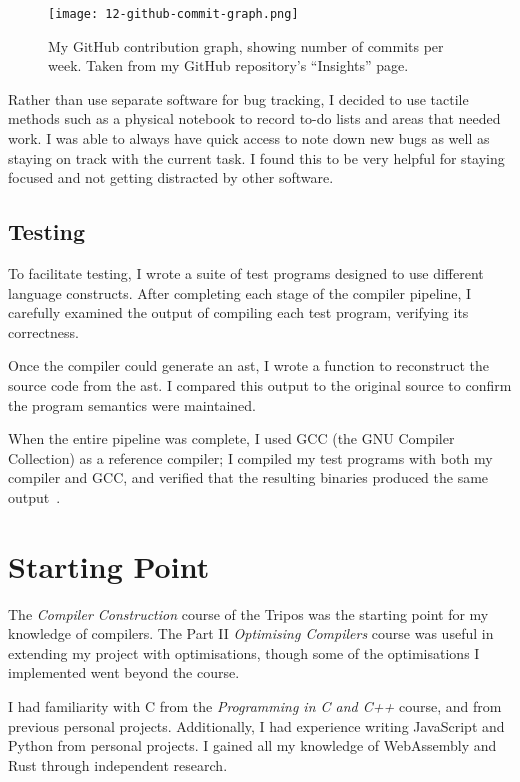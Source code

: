 \documentclass[00-main.tex]{subfiles}
\begin{document}
\begin{figure}[t]
  \centering
  \texttt{[image: 12-github-commit-graph.png]}
  \caption{My GitHub contribution graph, showing number of commits per week. Taken from my GitHub repository's ``Insights'' page.}%
  \label{fig:github contribution graph}
\end{figure}

Rather than use separate software for bug tracking, I decided to use tactile methods such as a physical notebook to record to-do lists and areas that needed work.
I was able to always have quick access to note down new bugs as well as staying on track with the current task.
I found this to be very helpful for staying focused and not getting distracted by other software.

\subsection{Testing}

To facilitate testing, I wrote a suite of test programs designed to use different language constructs.
After completing each stage of the compiler pipeline, I carefully examined the output of compiling each test program, verifying its correctness.

Once the compiler could generate an \gls{ast}, I wrote a function to reconstruct the source code from the \gls{ast}.
I compared this output to the original source to confirm the program semantics were maintained.

When the entire pipeline was complete, I used GCC (the GNU Compiler Collection) as a reference compiler; I compiled my test programs with both my compiler and GCC, and verified that the resulting binaries produced the same output~.

\section{Starting Point}

The \emph{Compiler Construction} course of the Tripos was the starting point for my knowledge of compilers.
The Part II \emph{Optimising Compilers} course was useful in extending my project with optimisations, though some of the optimisations I implemented went beyond the course.

I had familiarity with C from the \emph{Programming in C and C++} course, and from previous personal projects.
Additionally, I had experience writing JavaScript and Python from personal projects.
I gained all my knowledge of WebAssembly and Rust through independent research.
\end{document}
